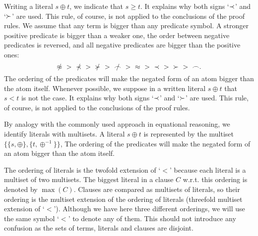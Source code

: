 Writing a literal $s\oplus t$, we indicate that \(s\geq 
t\). It explains why both
signs `$\mathbin{\prec}$' and  `$\mathbin{\succ}$' are used. This rule, of course, is not applied to the
conclusions of the proof rules. We assume that any
term is bigger than any predicate symbol.
A stronger positive predicate is bigger than a weaker one, the order between 
negative predicates is reversed, and all negative predicates are bigger than 
the positive ones:
 \begin{equation} \label{eq:predicate-order}
\notEq\ >\ \notIncl\ >\ \notCont\ >\ \notInt \ >\ \Eq\ >\ \Incl\ >\ \Cont\ >\ \Int.
 \end{equation}
The ordering of the predicates will make the negated form of an atom bigger
than the atom itself.  Whenever possible, we suppose in a written literal
$s\oplus t$ that  \(s < t\) is not the case. It explains why both signs
`$\mathbin{\prec}$' and `$\mathbin{\succ}$' are used. This rule, of course, is not applied to the
conclusions of the proof rules. 

By analogy with the commonly used approach in equational reasoning, we
identify literals with multisets.
A literal
$s\oplus t$ is represented by the multiset
\(\{\{s,\oplus\}, \{t,\oplus^{-1}\}\}\), 
The ordering of the predicates will make the negated form of an atom bigger
than the atom itself.

The ordering of literals is the twofold extension of `$<$' because each
literal is a multiset of two multisets. The biggest literal in a clause $C$ w.r.t.
this ordering is denoted by \(\max(C)\).  Clauses are compared as multisets of
literals, so their ordering is the multiset extension of the
ordering of literals (threefold multiset extension of `$<$'). Although
we have here three different orderings, we will use the same symbol `$<$' to
denote any of them. This should not introduce any confusion as the
 sets of terms, literals and clauses are disjoint.


